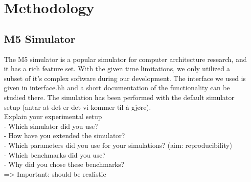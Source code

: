 \section{Methodology}

\subsection{M5 Simulator}
The M5 simulator is a popular simulator for computer architecture research, and it has a rich feature set. With the given time limitations, we only utilized a subset of it’s complex software during our development. The interface we used is given in interface.hh and a short documentation of the functionality can be studied there. The simulation has been performed with the default simulator setup (antar at det er det vi kommer til å gjøre).
\\
Explain your experimental setup\\
- Which simulator did you use?\\
- How have you extended the simulator?\\
- Which parameters did you use for your simulations? (aim: reproducibility)\\
- Which benchmarks did you use?\\
- Why did you chose these benchmarks?\\
=> Important: should be realistic